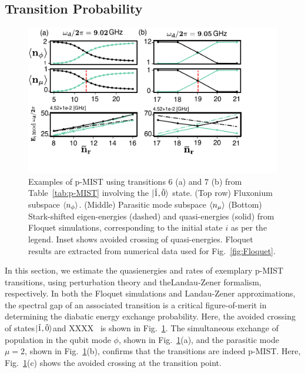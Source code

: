 \documentclass[prx,showpacs,notitlepage,twocolumn,superscriptaddress,nofootinbib,preprintnumbers,floatfix]{revtex4-2}
\begin{document}
\subsection{Transition Probability}
 \begin{figure}[htb]
    \centering
    \includegraphics[width=\linewidth]{Figures/Floquet_011.pdf}
    \caption{Examples of p-MIST using transitions $6$ (a) and $7$ (b) from Table~\ref{tab:p-MIST} involving the $\ket{\tilde{1},\tilde{0}}$ state. (Top row) Fluxonium subspace $\braket{n_\phi}$. (Middle) Parasitic mode subspace $\braket{n_\mu}$ (Bottom) Stark-shifted eigen-energies (dashed) and quasi-energies (solid) from Floquet simulations, corresponding to the initial state $i$ as per the legend. Inset shows avoided crossing of quasi-energies. Floquet results are extracted from numerical data used for Fig.~\ref{fig:Floquet}.}
    \label{fig:011}
\end{figure}
In this section, we estimate the quasienergies and rates of exemplary p-MIST transitions, using perturbation theory and theLandau-Zener formalism, respectively. In both the Floquet simulations and Landau-Zener approximations, the spectral gap of an associated transition is a critical figure-of-merit in determining the diabatic energy exchange probability. Here, the avoided crossing of states$\ket{\tilde{1},\tilde{0}}$and XXXX~\cite{zhang_universal_2021} is shown in Fig.~\ref{fig:011}. The simultaneous exchange of population in the qubit mode $\phi$, shown in Fig.~\ref{fig:011}(a), and the parasitic mode $\mu=2$, shown in Fig.~\ref{fig:011}(b), confirms that the transitions are indeed p-MIST. Here,  Fig.~\ref{fig:011}(c) shows the avoided crossing at the transition point. 
\end{document}
